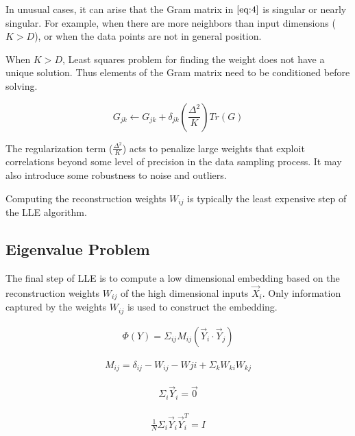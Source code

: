 \documentclass[11pt]{article}
\begin{document}
In unusual cases, it can arise that the Gram matrix in \(\eqref{eq:4}\) is
singular or nearly singular. For example, when there are more neighbors than
input dimensions (\(K > D\)), or when the data points are not in general position.

When \(K > D\), Least squares problem for finding the weight does not have a
unique solution. Thus elements of the Gram matrix need to be conditioned before solving.

$$
G_{jk} \leftarrow G_{jk} + \delta_{jk} (\frac{\Delta^2}{K}) Tr(G)
$$

The regularization term (\(\frac{\Delta^2}{K}\)) acts to penalize large weights that exploit correlations
beyond some level of precision in the data sampling process. It may also
introduce some robustness to noise and outliers.

Computing the reconstruction weights \(W_{ij}\) is typically the least expensive
step of the LLE algorithm.

\subsection{Eigenvalue Problem}
\label{sec:org861a824}

The final step of LLE is to compute a low dimensional embedding based on the
reconstruction weights \(W_{ij}\) of the high dimensional inputs \(\vec X_i\). Only
information captured by the weights \(W_{ij}\) is used to construct the embedding.

\begin{equation}
\begin{split}
\label{eq:6}
\Phi(Y) = \Sigma_{ij} M_{ij} (\vec Y_i \cdot \vec Y_j)
\end{split}
\end{equation}

\begin{equation}
\begin{split}
\label{eq:7}
M_{ij} = \delta_{ij} - W_{ij} - W{ji} + \Sigma_k W_{ki} W_{kj}
\end{split}
\end{equation}

\begin{equation}
\begin{split}
\label{eq:8}
\Sigma_i \vec Y_i = \vec 0
\end{split}
\end{equation}

\begin{equation}
\begin{split}
\label{eq:9}
\frac{1}{N} \Sigma_i \vec Y_i \vec Y_i^T = I
\end{split}
\end{equation}
\end{document}
